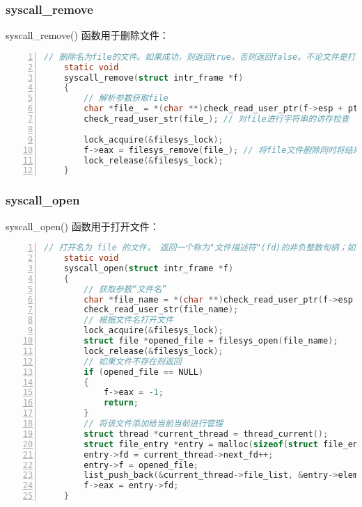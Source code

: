 \documentclass{article}
\begin{document}
	\subsubsection{syscall\_remove}
	
	syscall\_remove() 函数用于删除文件：
	
	\begin{lstlisting}[xleftmargin = 4em,xrightmargin = 4em, aboveskip = 1em, numbers = left, language = C,title=src/userprog/syscall.c - syscall\_remove()]
    // 删除名为file的文件。如果成功，则返回true，否则返回false。不论文件是打开还是关闭，都可以将其删除，并且删除打开的文件不会将其关闭。
    static void
    syscall_remove(struct intr_frame *f)
    {
        // 解析参数获取file
        char *file_ = *(char **)check_read_user_ptr(f->esp + ptr_size, ptr_size);
        check_read_user_str(file_); // 对file进行字符串的访存检查
        
        lock_acquire(&filesys_lock);
        f->eax = filesys_remove(file_); // 将file文件删除同时将结果返回给eax
        lock_release(&filesys_lock);
    }
	\end{lstlisting}
	
	\subsubsection{syscall\_open}
	
	syscall\_open() 函数用于打开文件：
	
	\begin{lstlisting}[xleftmargin = 4em,xrightmargin = 4em, aboveskip = 1em, numbers = left, language = C,title=src/userprog/syscall.c - syscall\_open()]
    // 打开名为 file 的文件， 返回一个称为"文件描述符"(fd)的非负整数句柄；如果无法打开文件，则返回-1.
    static void
    syscall_open(struct intr_frame *f)
    {
        // 获取参数“文件名”
        char *file_name = *(char **)check_read_user_ptr(f->esp + ptr_size, ptr_size);
        check_read_user_str(file_name);
        // 根据文件名打开文件
        lock_acquire(&filesys_lock);
        struct file *opened_file = filesys_open(file_name);
        lock_release(&filesys_lock);
        // 如果文件不存在则返回
        if (opened_file == NULL)
        {
            f->eax = -1;
            return;
        }
        // 将该文件添加给当前当前进行管理
        struct thread *current_thread = thread_current();
        struct file_entry *entry = malloc(sizeof(struct file_entry));
        entry->fd = current_thread->next_fd++;
        entry->f = opened_file;
        list_push_back(&current_thread->file_list, &entry->elem);
        f->eax = entry->fd;
    }
	\end{lstlisting}
	
\end{document}
